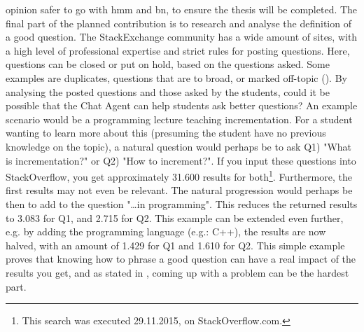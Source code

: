 opinion safer to go with \gls{hmm} and \gls{bn}, to ensure the thesis will be completed. 
\vspace{0.5em}\newline
The final part of the planned contribution is to research and analyse the definition of a good question. The StackExchange community has a wide amount of sites, with a high level 
of professional expertise and strict rules for posting questions. Here, questions can be closed or put on hold, based on the questions asked. Some examples are duplicates, questions 
that are to broad, or marked off-topic (\citet{Stackoverflow.com2015,CommunityWiki2015}). By analysing the posted questions and those asked by the students, could it be possible 
that the Chat Agent can help students ask better questions? 
\vspace{0.5em}\newline
An example scenario would be a programming lecture teaching incrementation. For a student wanting to learn more about this 
(presuming the student have no previous knowledge on the topic), a natural question would perhaps be to ask Q1) "What is incrementation?" or Q2) "How to increment?". If you input 
these questions into StackOverflow, you get approximately 31.600 results for both\footnote{This search was executed 29.11.2015, on StackOverflow.com.}. Furthermore, the first results 
may not even be relevant. The natural progression would perhaps be then to add to the question "\ldots in programming". This reduces the returned results to 3.083 for Q1, and 2.715 
for Q2. This example can be extended even further, e.g. by adding the programming language (e.g.: C++), the results are now halved, with an amount of 1.429 for Q1 and 1.610 for Q2. 
This simple example proves that knowing how to phrase a good question can have a real impact of the results you get, and as stated in \citet{Lucky2011}, coming up with a problem can be 
the hardest part.
